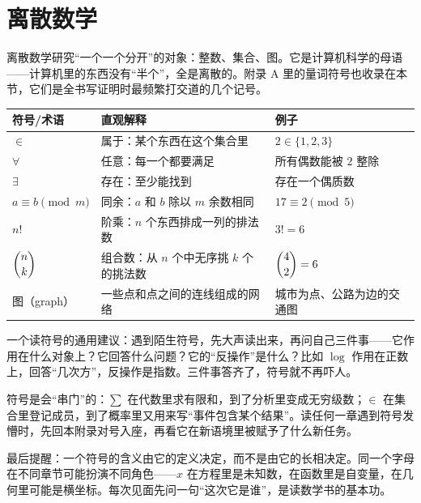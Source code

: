 \section{离散数学}

离散数学研究“一个一个分开”的对象：整数、集合、图。它是计算机科学的母语——计算机里的东西没有“半个”，全是离散的。附录 A 里的量词符号也收录在本节，它们是全书写证明时最频繁打交道的几个记号。

\begin{center}
\begin{tabular}{lp{4.8cm}p{5.4cm}}
\toprule
符号/术语 & 直观解释 & 例子 \\
\midrule
$\in$ & 属于：某个东西在这个集合里 & $2\in\{1,2,3\}$ \\
$\forall$ & 任意：每一个都要满足 & 所有偶数能被 $2$ 整除 \\
$\exists$ & 存在：至少能找到 & 存在一个偶质数 \\
$a\equiv b\pmod{m}$ & 同余：$a$ 和 $b$ 除以 $m$ 余数相同 & $17\equiv 2\pmod{5}$ \\
$n!$ & 阶乘：$n$ 个东西排成一列的排法数 & $3!=6$ \\
$\dbinom{n}{k}$ & 组合数：从 $n$ 个中无序挑 $k$ 个的挑法数 & $\dbinom{4}{2}=6$ \\
图（graph） & 一些点和点之间的连线组成的网络 & 城市为点、公路为边的交通图 \\
\bottomrule
\end{tabular}
\end{center}

一个读符号的通用建议：遇到陌生符号，先大声读出来，再问自己三件事——它作用在什么对象上？它回答什么问题？它的“反操作”是什么？比如 $\log$ 作用在正数上，回答“几次方”，反操作是指数。三件事答齐了，符号就不再吓人。

\begin{lianjie}
符号是会“串门”的：$\sum$ 在代数里求有限和，到了分析里变成无穷级数；$\in$ 在集合里登记成员，到了概率里又用来写“事件包含某个结果”。读任何一章遇到符号发懵时，先回本附录对号入座，再看它在新语境里被赋予了什么新任务。
\end{lianjie}

最后提醒：一个符号的含义由它的定义决定，而不是由它的长相决定。同一个字母在不同章节可能扮演不同角色——$x$ 在方程里是未知数，在函数里是自变量，在几何里可能是横坐标。每次见面先问一句“这次它是谁”，是读数学书的基本功。
